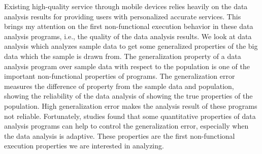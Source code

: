 Existing high-quality
service through mobile devices relies heavily on the data analysis results
for providing users with personalized accurate services. This brings my attention on the
first non-functional execution behavior in these data analysis programs, i.e., the quality of the data analysis results.
We look at data analysis which analyzes sample data to get some generalized properties of the big data which the sample is drawn from.
The generalization property of a data analysis program over sample data with respect to the population is one of the important non-functional properties of programs.
The generalization error measures the difference of property from the sample data and population, showing the reliability of the data analysis of showing the true properties of the population. 
High generalization error makes the analysis result of these programs not reliable.
Fortunately, studies found that some quantitative properties of data analysis programs can help to control the generalization error, especially when the data analysis is adaptive.
These properties are the first non-functional execution properties we are interested in
analyzing.

